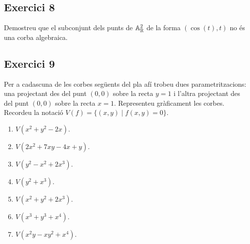 \documentclass[11pt, a4paper]{article}
\begin{document}
\subsection{Exercici 8}
\newpage
\begin{tcolorbox}[title=\section{Exercici 9}]
Demostreu que el subconjunt dels punts de $\mathbb A^2_\mathbb R$ de la forma $(\cos(t),t)$ no és una corba algebraica.
\end{tcolorbox}
\subsection{Exercici 9}

\newpage
\begin{tcolorbox}[title=\section{Exercici 14}]
Per a cadascuna de les corbes següents del pla afí trobeu dues parametritzacions: una projectant des del punt $(0, 0)$ sobre la recta $y = 1$ i l'altra projectant des del punt $(0, 0)$ sobre la recta $x = 1$. Representeu gràficament les corbes. Recordeu la notació $V (f) = \{(x, y) \mid f(x, y) = 0\}$.
\begin{enumerate}
    \item $V(x^2 + y^2 - 2x)$.
    \item $V(2x^2 +7xy-4x+y)$.
    \item $V(y^2-x^2+2x^3)$.
    \item $V(y^2+x^3)$.
    \item $V(x^2+y^2+2x^3)$.
    \item $V(x^3+y^3+x^4)$.
    \item $V(x^2y-xy^2+x^4)$.
\end{enumerate} 
\end{tcolorbox}
\end{document}
